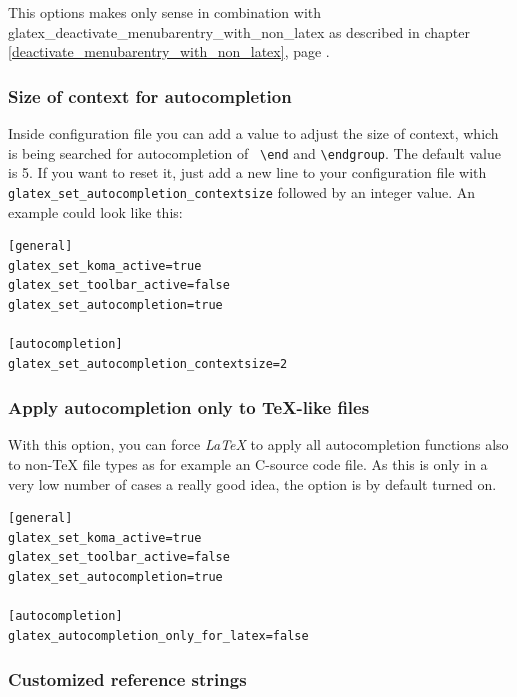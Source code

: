 \documentclass[%
paper=a4,%
fontsize=11pt,%
twoside=false,%
DIV18,%
headsepline,%
plainheadsepline,%
footsepline,%
plainfootsepline,%
bibliography=totoc,%
listof=totoc,%
BCOR10mm,%
parskip=half,%
openany,%
]{scrreprt}
\begin{document}
This options makes only sense in combination with
glatex\_deactivate\_menubarentry\_with\_non\_latex
as described in chapter \ref{deactivate_menubarentry_with_non_latex},
page \pageref {deactivate_menubarentry_with_non_latex}.

\subsubsection{Size of context for autocompletion}
\label{sec:hidden_pref_autocompletion_context}
Inside configuration file you can add a value to adjust the size of
context, which is being searched for autocompletion of \texttt{
\textbackslash{}end} and \texttt{\textbackslash{}endgroup}. The
default value is 5. If you want to reset it, just add a new line to
your configuration file with
\texttt{glatex\_set\_autocompletion\_contextsize} followed by an integer
value. An example could look like this:

\begin{lstlisting}[caption={Example configuration for contextsize of autocompletion}]
[general]
glatex_set_koma_active=true
glatex_set_toolbar_active=false
glatex_set_autocompletion=true

[autocompletion]
glatex_set_autocompletion_contextsize=2
\end{lstlisting}

\subsubsection{Apply autocompletion only to \TeX{}-like files}
With this option, you can force \textit{LaTeX} to apply all autocompletion functions also to non-\TeX{} file types as for example an C-source code file. As this is only in a very low number of cases a really good idea, the option is by default turned on.

\begin{lstlisting}[caption={general.conf example for deactivating file %
                           type specific restrictions for autocompletion}]
[general]
glatex_set_koma_active=true
glatex_set_toolbar_active=false
glatex_set_autocompletion=true

[autocompletion]
glatex_autocompletion_only_for_latex=false
\end{lstlisting}

\subsubsection{Customized reference strings}
\end{document}
